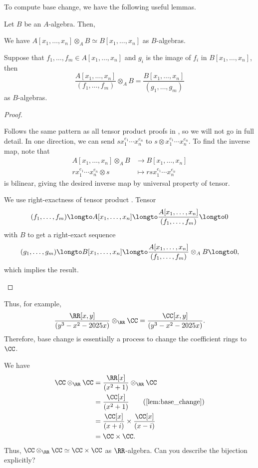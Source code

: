 To compute base change, we have the following useful lemmas.
\begin{lemma}
\label{lem:base_change}
Let $B$ be an $A$-algebra. Then,
\begin{alphenum}
    \item We have $A[x_1,\dots,x_n]\otimes_A B
    \simeq B[x_1,\dots,x_n]$ as $B$-algebras.
    \item Suppose that $f_1,\dots,f_m\in A[x_1,\dots,x_n]$
    and $g_i$ is the image of $f_i$ in $B[x_1,\dots,x_n]$, then
    $$\frac{A[x_1,\dots,x_n]}{(f_1,\dots,f_m)}
    \otimes_A B = \frac{B[x_1,\dots,x_n]}{(g_1,\dots,g_m)}$$
    as $B$-algebras.
\end{alphenum}
\end{lemma}
\begin{proof}
\begin{alphenum}
    \item Follows the same pattern as all tensor product proofs in ,
    so we will not go in full detail.
    In one direction, we can send
    $sx_1^{e_1}\cdots x_n^{e_n}$ to
    $s\otimes x_1^{e_1}\cdots x_n^{e_n}$.
    To find the inverse map, note that
    \begin{align*}
        A[x_1,\dots,x_n]\otimes_A B &\to B[x_1,\dots,x_n] \\
        rx_1^{e_1}\cdots x_n^{e_n}\otimes s &\mapsto
        rsx_1^{e_1}\cdots x_n^{e_n}
    \end{align*}
    is bilinear, giving the desired inverse map
    by universal property of tensor.
    \item We use right-exactness of tensor product
    . Tensor
    $$(f_1,\dots,f_m) \longto A[x_1,\dots,x_n]
    \longto \frac{A[x_1,\dots,x_n]}{(f_1,\dots,f_m)}
    \longto 0$$
    with $B$ to get a right-exact sequence
    $$(g_1,\dots,g_m) \longto B[x_1,\dots,x_n]
    \longto \frac{A[x_1,\dots,x_n]}{(f_1,\dots,f_m)}
    \otimes_A B
    \longto 0,$$
    which implies the result. \qedhere
\end{alphenum}
\end{proof}
Thus, for example, 
$$\frac{\RR[x,y]}{(y^3-x^2-2025x)}
\otimes_\RR \CC 
= \frac{\CC[x,y]}{(y^3-x^2-2025x)}.$$
Therefore, base change is essentially a process
to change the coefficient rings to $\CC$.
\begin{example}
We have
\begin{align*}
    \CC \otimes_\RR \CC 
    &= \frac{\RR[x]}{(x^2+1)}
    \otimes_\RR \CC \\
    &= \frac{\CC[x]}{(x^2+1)} 
    \tag{\Cref{lem:base_change}}\\
    &= \frac{\CC[x]}{(x+i)} \times \frac{\CC[x]}{(x-i)} \\
    &= \CC \times \CC.
\end{align*}
Thus, $\CC\otimes_\RR \CC \simeq \CC\times \CC$ 
as $\RR$-algebra. Can you describe the bijection explicitly?
\end{example}

